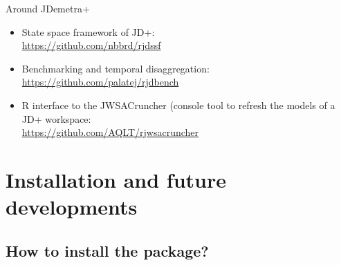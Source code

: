 \documentclass[10pt,xcolor=table,color={dvipsnames,usenames},ignorenonframetext,usepdftitle=false,french]{beamer}
\providecommand{\tightlist}{%
  \setlength{\parskip}{0pt}
  }
\begin{document}
\begin{frame}{Around JDemetra+}
\protect\hypertarget{around-jdemetra-1}{}

\begin{itemize}
\tightlist
\item
  State space framework of JD+:\\
  \faGithub{} \url{https://github.com/nbbrd/rjdssf}
\end{itemize}

\medskip

\begin{itemize}
\tightlist
\item
  Benchmarking and temporal disaggregation:\\
  \faGithub{} \url{https://github.com/palatej/rjdbench}
\end{itemize}

\medskip

\begin{itemize}
\tightlist
\item
  R interface to the JWSACruncher (console tool to refresh the models of
  a JD+ workspace:\\
  \faGithub{} \url{https://github.com/AQLT/rjwsacruncher}
\end{itemize}

\end{frame}

\hypertarget{installation-and-future-developments}{%
\section{Installation and future
developments}\label{installation-and-future-developments}}

\hypertarget{how-to-install-the-package}{%
\subsection{How to install the
package?}\label{how-to-install-the-package}}
\end{document}
